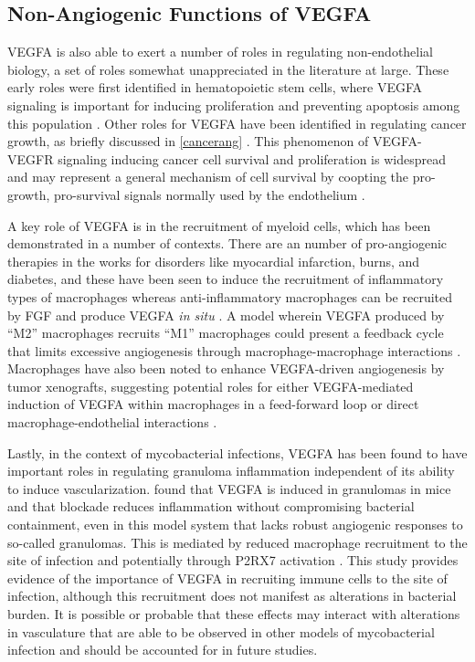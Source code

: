 \subsection{Non\hyp{}Angiogenic Functions of VEGFA}

VEGFA is also able to exert a number of roles in regulating non\hyp{}endothelial biology, a set of roles somewhat unappreciated in the literature at large. These early roles were first identified in hematopoietic stem cells, where VEGFA signaling is important for inducing proliferation and preventing apoptosis among this population \citep{Gerber2002}. Other roles for VEGFA have been identified in regulating cancer growth, as briefly discussed in \autoref{cancerang} \citep{Goel2013}. This phenomenon of VEGFA\hyp{}VEGFR signaling inducing cancer cell survival and proliferation is widespread and may represent a general mechanism of cell survival by coopting the pro\hyp{}growth, pro\hyp{}survival signals normally used by the endothelium \citep{Wiszniak2021, Mercurio2005}. 

A key role of VEGFA is in the recruitment of myeloid cells, which has been demonstrated in a number of contexts. There are an number of pro\hyp{}angiogenic therapies in the works for disorders like myocardial infarction, burns, and diabetes, and these have been seen to induce the recruitment of inflammatory types of macrophages whereas anti\hyp{}inflammatory macrophages can be recruited by FGF and produce VEGFA \textit{in situ} \citep{Lucerna2007}. A model wherein VEGFA produced by ``M2'' macrophages recruits ``M1'' macrophages could present a feedback cycle that limits excessive angiogenesis through macrophage\hyp{}macrophage interactions \citep{Barbay2015}. Macrophages have also been noted to enhance VEGFA\hyp{}driven angiogenesis by tumor xenografts, suggesting potential roles for either VEGFA\hyp{}mediated induction of VEGFA within macrophages in a feed\hyp{}forward loop or direct macrophage\hyp{}endothelial interactions \citep{Britto2018}.

Lastly, in the context of mycobacterial infections, VEGFA has been found to have important roles in regulating granuloma inflammation independent of its ability to induce vascularization. \citet{Harding2019} found that VEGFA is induced in granulomas in mice and that blockade reduces inflammation without compromising bacterial containment, even in this model system that lacks robust angiogenic responses to so\hyp{}called granulomas. This is mediated by reduced macrophage recruitment to the site of infection and potentially through P2RX7 activation \citep{Matty2019}. This study provides evidence of the importance of VEGFA in recruiting immune cells to the site of infection, although this recruitment does not manifest as alterations in bacterial burden. It is possible or probable that these effects may interact with alterations in vasculature that are able to be observed in other models of mycobacterial infection and should be accounted for in future studies.

